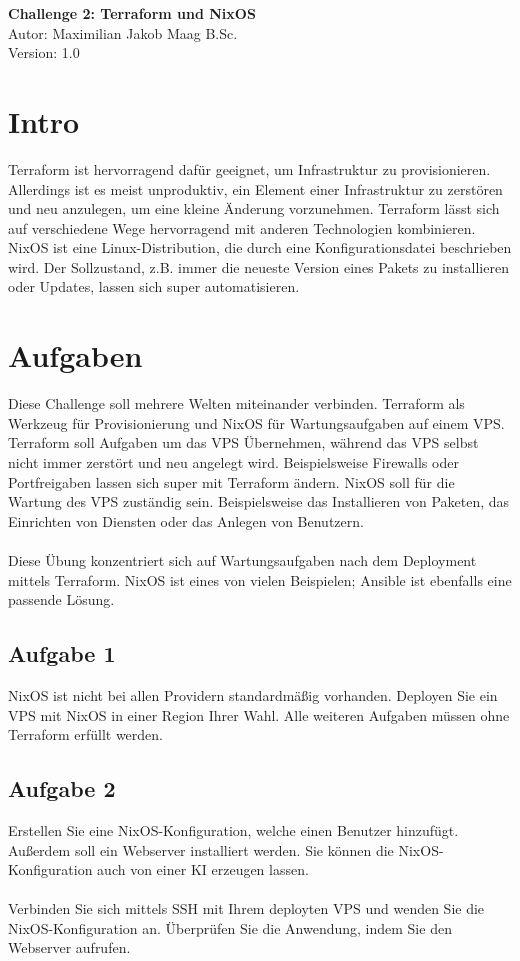\documentclass{article}
\begin{document}
    \begin{center}
        \Large \textbf{Challenge 2: Terraform und NixOS} \\ [6pt]
        \normalsize
        Autor: Maximilian Jakob Maag B.Sc. \\
        Version: 1.0
    \end{center}
    \section{Intro}
    Terraform ist hervorragend dafür geeignet, um Infrastruktur zu provisionieren. Allerdings ist es meist unproduktiv, ein Element einer Infrastruktur zu zerstören und neu anzulegen,
    um eine kleine Änderung vorzunehmen. Terraform lässt sich auf verschiedene Wege hervorragend mit anderen Technologien kombinieren.
    NixOS ist eine Linux-Distribution, die durch eine Konfigurationsdatei beschrieben wird.
    Der Sollzustand, z.B. immer die neueste Version eines Pakets zu installieren oder Updates, lassen sich super automatisieren.

    \section{Aufgaben}
    Diese Challenge soll mehrere Welten miteinander verbinden. Terraform als Werkzeug für Provisionierung und NixOS für Wartungsaufgaben auf einem VPS.
    Terraform soll Aufgaben um das VPS Übernehmen, während das VPS selbst nicht immer zerstört und neu angelegt wird. Beispielsweise Firewalls oder Portfreigaben lassen sich super mit Terraform ändern.
    NixOS soll für die Wartung des VPS zuständig sein. Beispielsweise das Installieren von Paketen, das Einrichten von Diensten oder das Anlegen von Benutzern. \\ \\
    Diese Übung konzentriert sich auf Wartungsaufgaben nach dem Deployment mittels Terraform. NixOS ist eines von vielen Beispielen; Ansible ist ebenfalls eine passende Lösung.

    \subsection{Aufgabe 1}
    NixOS ist nicht bei allen Providern standardmäßig vorhanden.
    Deployen Sie ein VPS mit NixOS in einer Region Ihrer Wahl. Alle weiteren Aufgaben müssen ohne Terraform erfüllt werden.

    \subsection{Aufgabe 2}
    Erstellen Sie eine NixOS-Konfiguration, welche einen Benutzer hinzufügt. Außerdem soll ein Webserver installiert werden.
    Sie können die NixOS-Konfiguration auch von einer KI erzeugen lassen. \\ \\
    Verbinden Sie sich mittels SSH mit Ihrem deployten VPS und wenden Sie die NixOS-Konfiguration an. Überprüfen Sie die Anwendung, indem Sie den Webserver aufrufen.
\end{document}
